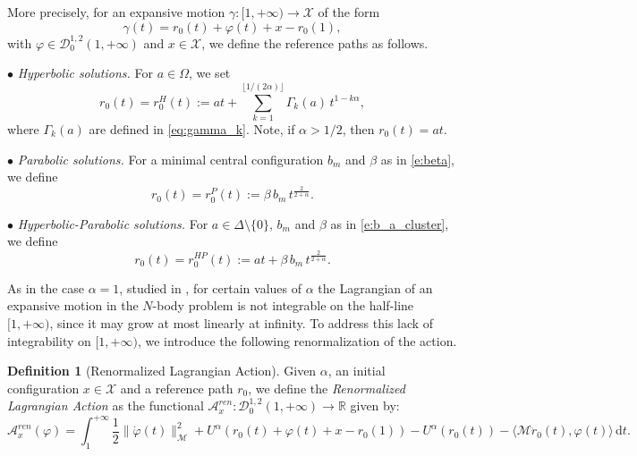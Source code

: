 \documentclass[a4paper,10pt]{amsart}
\theoremstyle{plain}
\theoremstyle{definition}
\newtheorem{defn}[thm]{Definition}
\numberwithin{equation}{section}
\numberwithin{thm}{section}
\begin{document}
More precisely, for an expansive motion $\gamma:[1,+\infty)\to\mathcal{X}$ of the form
\[
\gamma(t) = r_0(t) + \varphi(t) + x - r_0(1),
\]
with $\varphi \in \mathcal{D}_0^{1,2}(1,+\infty)$ and $x \in \mathcal{X}$, we define the reference paths as follows.

\smallskip
\noindent $\bullet$ {\em Hyperbolic solutions.}
For $a \in \Omega$, we set
\begin{equation}
    \label{eq:hyperbolic_r_0}
    r_0(t)=r_0^H(t):=at+\sum_{k=1}^{\lfloor 1/(2\alpha)\rfloor}\Gamma_k(a)\,t^{1-k\alpha},
\end{equation}
where $\Gamma_k(a)$ are defined in \eqref{eq:gamma_k}. Note, if $\alpha > 1/2$, then $r_0(t)=at$.

\noindent $\bullet$ {\em Parabolic solutions.}
For a minimal central configuration $b_m$ and $\beta$ as in \eqref{e:beta}, we define
\begin{equation}
    \label{eq:parabolic_eq}
    r_0(t)=r_0^P(t):= \beta \, b_m \,t^\frac{2}{2+\alpha}.
\end{equation} 

\noindent $\bullet$ {\em Hyperbolic-Parabolic solutions.}
For $a \in \Delta \setminus\{0\}$, $b_m$ and $\beta$ as in \eqref{e:b_a_cluster}, we define
\begin{equation}
    \label{eq:HP_eq}
    r_0(t)=r_0^{HP}(t):=at+ \beta \, b_m \,t^\frac{2}{2+\alpha}.
\end{equation}

As in the case $\alpha=1$, studied in \cite{PolimeniTerracini}, for certain values of $\alpha$ the Lagrangian of an expansive motion in the $N$-body problem is not integrable on the half-line $[1,+\infty)$, since it may grow at most linearly at infinity. To address this lack of integrability on $[1,+\infty)$, we introduce the following renormalization of the action.

\begin{defn}[Renormalized Lagrangian Action]\label{def:ren_action}
Given $\alpha$, an initial configuration $x \in \mathcal{X}$ and a reference path $r_0$, %
we define the \emph{Renormalized Lagrangian Action} as the functional $\mathcal{A}_x^{ren}: \mathcal{D}_0^{1,2}(1,+\infty) \to \mathbb{R}$ given by:
\begin{displaymath}\label{def:renormalized_action}
    \mathcal{A}_x^{ren}(\varphi) = \int_1^{+\infty}  \frac{1}{2} \|\dot{\varphi}(t)\|_\mathcal{M}^2 + U^\alpha(r_0(t) +\varphi(t) +  x - r_0(1)) - U^\alpha(r_0(t)) - \langle \mathcal{M} \ddot{r}_0(t), \varphi(t) \rangle \, \mathrm{d}t.
\end{displaymath}
\end{defn}
\end{document}

